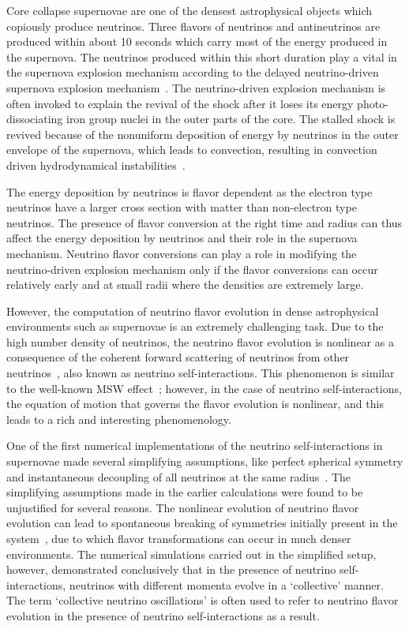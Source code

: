 \documentclass[aps, prd, 10pt, twocolumn, superscriptaddress, noshowpacs, preprintnumbers, longbibliography, groupedaddress, footinbib, bibnotes]{revtex4-1}
\begin{document}
Core collapse supernovae are one of the densest astrophysical objects which copiously produce neutrinos. 
Three flavors of neutrinos and antineutrinos are produced within about 10 seconds which carry most of the energy produced in the supernova. The neutrinos produced within this short duration play a vital in the supernova explosion mechanism according to the
delayed neutrino-driven supernova explosion mechanism~\cite{Bethe:1984ux}. 
The neutrino-driven explosion mechanism is often invoked to explain the revival of the shock after it loses its energy photo-dissociating iron group nuclei in the outer parts of the core. The stalled shock is revived because of the nonuniform deposition of energy by neutrinos in the outer envelope of the supernova, which leads to convection, resulting in convection driven hydrodynamical instabilities~\cite{Janka:2016fox}.

The energy deposition by neutrinos is flavor dependent as the electron type neutrinos have a larger cross section with matter than non-electron type neutrinos. The presence of flavor conversion at the right time and radius can thus affect the energy deposition by neutrinos and their role in the supernova mechanism. Neutrino flavor conversions can play a role in modifying the neutrino-driven explosion mechanism only if the flavor conversions can occur relatively early and at small radii where the densities are extremely large. 

However, the computation of neutrino flavor evolution in dense astrophysical environments such as supernovae is an extremely challenging task. Due to the high number density of neutrinos, the neutrino flavor evolution is nonlinear as a consequence of the coherent forward scattering of neutrinos from other neutrinos~\cite{Pantaleone:1992eq}, also known as neutrino self-interactions. This phenomenon is similar to the well-known MSW effect~\cite{Mikheev:1986gs, Wolfenstein:1977ue}; however, in the case of neutrino self-interactions, the equation of motion that governs the flavor evolution is nonlinear, and this leads to a rich and interesting phenomenology.

One of the first numerical implementations of the neutrino self-interactions in supernovae made several simplifying assumptions, like perfect spherical symmetry and instantaneous decoupling of all neutrinos at the same radius~\cite{Duan:2006jv, Duan:2006an, Duan:2005cp, Duan:2010bg}. The simplifying assumptions made in the earlier calculations were found to be unjustified for several reasons. The nonlinear evolution of neutrino flavor evolution can lead to spontaneous breaking of symmetries initially present in the system~\cite{Raffelt:2013rqa, Duan:2014gfa, Abbar:2015mca}, due to which flavor transformations can occur in much denser environments. The numerical simulations carried out in the simplified setup, however, demonstrated conclusively that in the presence of neutrino self-interactions, neutrinos with different momenta evolve in a `collective' manner. The term `collective neutrino oscillations' is often used to refer to neutrino flavor evolution in the presence of neutrino self-interactions as a result.
\end{document}
